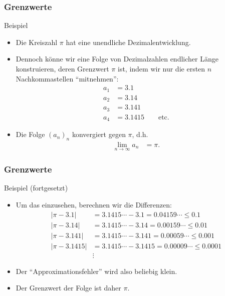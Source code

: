 \documentclass{beamer}
\newcommand{\abs}[1]{\left|#1\right|}
\renewcommand{\ae}{\"a}
\renewcommand{\oe}{\"o}
\newcommand{\mytitle}{Grenzwerte}
\begin{document}
\begin{frame}\frametitle{\mytitle}
	\begin{block}{Beispiel}
		\begin{itemize}
			\item Die Kreiszahl $\pi$ hat eine unendliche Dezimalentwicklung.
			\item Dennoch k\oe nne wir eine Folge von Dezimalzahlen endlicher L\ae nge konstruieren, deren Grenzwert $\pi$ ist, indem wir nur die ersten $n$ Nachkommastellen ``mitnehmen'':
				\begin{align*}
					a_1&=3.1\\
					a_2&=3.14\\
					a_3&=3.141\\
					a_4&=3.1415\qquad\mbox{etc.}
				\end{align*}
			\item Die Folge $(a_n)_n$ konvergiert gegen $\pi$, d.h.\
				\begin{align*}
					\lim_{n\to\infty}a_n&=\pi.
				\end{align*}
		\end{itemize}
	\end{block}
\end{frame}

\begin{frame}\frametitle{\mytitle}
	\begin{block}{Beispiel (fortgesetzt)}
		\begin{itemize}
			\item Um das einzusehen, berechnen wir die Differenzen:
				\begin{align*}
					\abs{\pi-3.1}&=3.1415\cdots-3.1=0.04159\cdots\leq0.1\\
					\abs{\pi-3.14}&=3.1415\cdots-3.14=0.00159\cdots\leq0.01\\
					\abs{\pi-3.141}&=3.1415\cdots-3.141=0.00059\cdots\leq0.001\\
					\abs{\pi-3.1415}&=3.1415\cdots-3.1415=0.00009\cdots\leq0.0001\\
									&\vdots
				\end{align*}
			\item Der ``Approximationsfehler'' wird also beliebig klein.
			\item Der Grenzwert der Folge ist daher $\pi$.
		\end{itemize}
	\end{block}
\end{frame}
\end{document}
